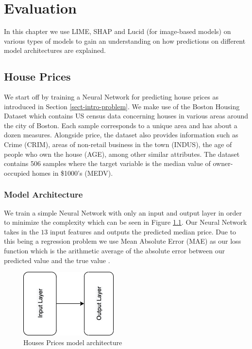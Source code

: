 

\chapter{Evaluation} \label{sect-evaluation}
In this chapter we use LIME, SHAP and Lucid (for image-based models) on various types of models to gain an understanding on how predictions on different model architectures are explained.

\section{House Prices}
We start off by training a Neural Network for predicting house prices as introduced in Section \ref{sect-intro-problem}. We make use of the  Boston Housing Dataset \cite{Http://lib.stat.cmu.edu/datasets/boston} which contains US census data concerning houses in various areas around the city of Boston. Each sample corresponds to a unique area and has about a dozen measures. Alongside price, the dataset also provides information such as Crime (CRIM), areas of non-retail business in the town (INDUS), the age of people who own the house (AGE), among other similar attributes.  The dataset contains 506 samples where the target variable is the median value of owner-occupied homes in \$1000's (MEDV).
\subsection{Model Architecture}
We train a simple Neural Network with only an input and output layer in order to minimize the complexity which can be seen in Figure \ref{fig:house-architecture}. Our Neural Network takes in the $13$ input features and outputs the predicted median price. Due to this being a regression problem we use Mean Absolute Error (MAE) as our loss function which is the  arithmetic average of the absolute error between our predicted value and the true value \cite{Wang_2018}. 
\begin  {figure}[!htpb]
\centering
  \includegraphics[width=0.4\linewidth]{Evaluation_Images/House_Prices_Architecture.png}
  \caption{Houses Prices model architecture}
  \label{fig:house-architecture}
\end{figure}
